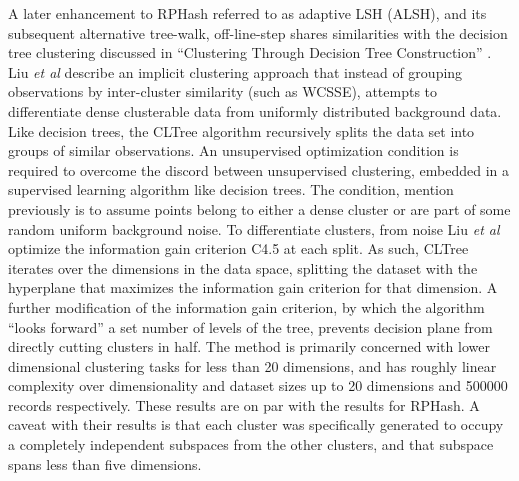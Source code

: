A later enhancement to \textsf{RPHash} referred to as adaptive LSH (ALSH), and its subsequent alternative tree-walk,
off-line-step shares similarities with the decision tree clustering discussed in ``Clustering Through Decision Tree
Construction'' \cite{Liu2000}.  Liu \emph{et al} describe an implicit clustering approach that instead of grouping
observations by inter-cluster similarity (such as WCSSE), attempts to differentiate dense clusterable data from
uniformly distributed background data.  Like decision trees, the CLTree algorithm recursively splits the data set into
groups of similar observations.  An unsupervised optimization condition is required to overcome the discord between
unsupervised clustering, embedded in a supervised learning algorithm like decision trees.  The condition, mention
previously is to assume points belong to either a dense cluster or are part of some random uniform background noise.  To
differentiate clusters, from noise Liu \emph{et al} optimize the information gain criterion C4.5 at each split.  As such,
CLTree iterates over the dimensions in the data space, splitting the dataset with the hyperplane that maximizes the
information gain criterion for that dimension.  A further modification of the information gain criterion, by which the
algorithm ``looks forward'' a set number of levels of the tree, prevents decision plane from directly cutting clusters
in half.  The method is primarily concerned with lower dimensional clustering tasks for less than 20 dimensions, and has
roughly linear complexity over dimensionality and dataset sizes up to 20 dimensions and 500000 records respectively.
These results are on par with the results for \textsf{RPHash}.  A caveat with their results is that each cluster was
specifically generated to occupy a completely independent subspaces from the other clusters, and that subspace spans less than
five dimensions.
